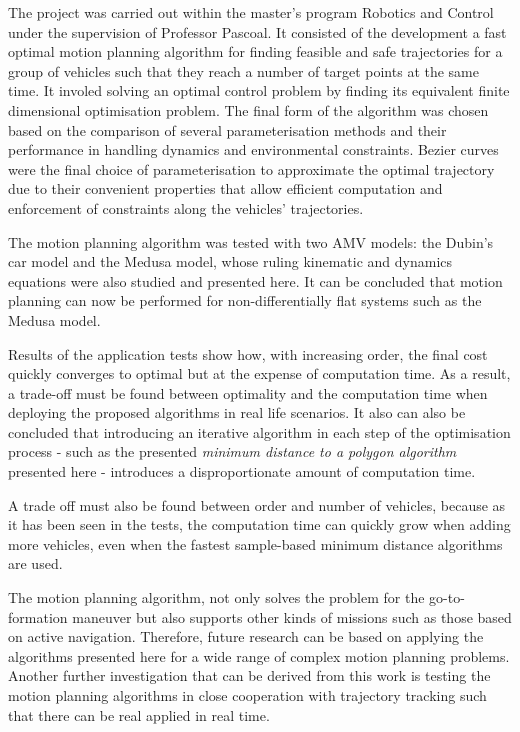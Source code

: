 \cleardoublepage%
\label{chap:conclusion}

\par The project was carried out within the master's program Robotics and Control under the supervision of Professor Pascoal. It consisted of the development a fast optimal motion planning algorithm for finding feasible and safe trajectories for a group of vehicles such that they reach a number of target points at the same time. It involed solving an optimal control problem by finding its equivalent finite dimensional optimisation problem. The final form of the algorithm was chosen based on the comparison of several parameterisation methods and their performance in handling dynamics and environmental constraints. Bezier curves were the final choice of parameterisation to approximate the optimal trajectory due to their convenient properties that allow efficient computation and enforcement of constraints along the vehicles’ trajectories.



\par The motion planning algorithm was tested with two \ac{AMV} models: the Dubin's car model and the Medusa model, whose ruling kinematic and dynamics equations were also studied and presented here. It can be concluded that motion planning can now be performed for non-differentially flat systems such as the Medusa model.
\par Results of the application tests show how, with increasing order, the final cost quickly converges to optimal but at the expense of computation time. As a result, a trade-off must be found between optimality and the computation time when deploying the proposed algorithms in real life scenarios. It also can also be concluded that introducing an iterative algorithm in each step of the optimisation process - such as the presented \textit{minimum distance to a polygon algorithm} presented here - introduces a disproportionate amount of computation time.
\par A trade off must also be found between order and number of vehicles, because as it has been seen in the tests, the computation time can quickly grow when adding more vehicles, even when the fastest sample-based minimum distance algorithms are used.
\par The motion planning algorithm, not only solves the problem for the go-to-formation maneuver but also supports other kinds of missions such as those based on active navigation. Therefore, future research can be based on applying the algorithms presented here for a wide range of complex motion planning problems. Another further investigation that can be derived from this work is testing the motion planning algorithms in close cooperation with trajectory tracking such that there can be real applied in real time.



